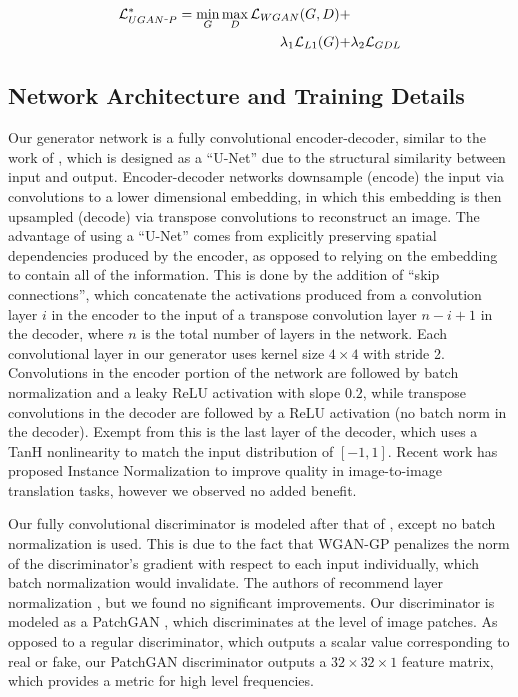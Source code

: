 \begin{equation}
   \begin{aligned}
      \mathcal{L}_{UGAN\scalebox{0.4}[1.0]{\( - \)}P}^* = \min\limits_{G}\max\limits_{D} \mathcal{L}_{WGAN}(G,D) + & \\
      \lambda_{1} \mathcal{L}_{L1}(G) + & \lambda_{2} \mathcal{L}_{GDL}
   \end{aligned}
\end{equation}


\subsection{Network Architecture and Training Details}
Our generator network is a fully convolutional encoder-decoder, similar to the work of \cite{isola2016image}, which is
designed as a ``U-Net'' \cite{ronneberger2015u} due to the structural similarity between input and output.
Encoder-decoder networks downsample (encode) the input via convolutions to a lower dimensional embedding, in which
this embedding is then upsampled (decode) via transpose convolutions to reconstruct an image. The advantage of using
a ``U-Net'' comes from explicitly preserving spatial dependencies produced by the encoder, as opposed to relying on the
embedding to contain all of the information. This is done by the addition of ``skip connections'', which concatenate
the activations produced from a convolution layer $i$ in the encoder to the input of a transpose convolution layer
$n-i+1$ in the decoder, where $n$ is the total number of layers in the network. Each convolutional layer in our
generator uses kernel size $4 \times 4$ with stride 2. Convolutions in the encoder portion of the network are followed
by batch normalization \cite{pmlr-v37-ioffe15} and a leaky ReLU activation with slope $0.2$, while transpose
convolutions in the decoder are followed by a ReLU activation \cite{nair2010rectified} (no batch norm in the decoder).
Exempt from this is the last layer of the decoder, which uses a TanH nonlinearity to match the input distribution of
$[-1, 1]$. Recent work has proposed Instance Normalization \cite{ulyanov2016instance} to improve quality
in image-to-image translation tasks, however we observed no added benefit.

Our fully convolutional discriminator is modeled after that of \cite{radford2015unsupervised}, except no batch
normalization is used. This is due to the fact that WGAN-GP penalizes the norm of the discriminator's gradient with
respect to each input individually, which batch normalization would invalidate. The authors of
\cite{gulrajani2017improved} recommend layer normalization \cite{ba2016layer}, but we found no significant improvements.
Our discriminator is modeled as a PatchGAN \cite{isola2016image,li2016precomputed}, which discriminates at the level of
image patches. As opposed to a regular discriminator, which outputs a scalar value corresponding to real or fake, our
PatchGAN discriminator outputs a $32 \times 32 \times 1$ feature matrix, which provides a metric for high level
frequencies. %

